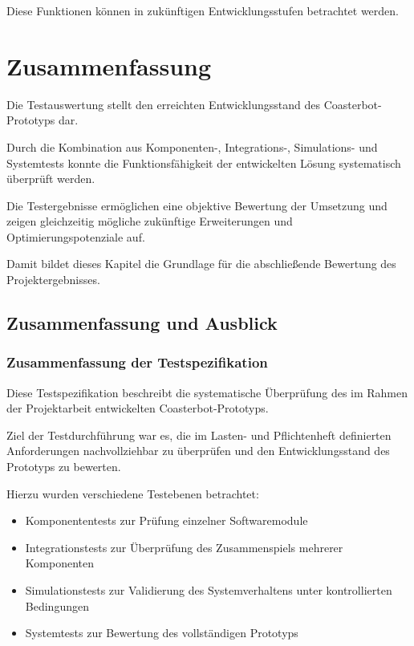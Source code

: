 Diese Funktionen können in zukünftigen Entwicklungsstufen betrachtet
werden.

\section{Zusammenfassung}\label{zusammenfassung-2}

Die Testauswertung stellt den erreichten Entwicklungsstand des
Coasterbot-Prototyps dar.

Durch die Kombination aus Komponenten-, Integrations-, Simulations- und
Systemtests konnte die Funktionsfähigkeit der entwickelten Lösung
systematisch überprüft werden.

Die Testergebnisse ermöglichen eine objektive Bewertung der Umsetzung
und zeigen gleichzeitig mögliche zukünftige Erweiterungen und
Optimierungspotenziale auf.

Damit bildet dieses Kapitel die Grundlage für die abschließende
Bewertung des Projektergebnisses.

\subsection{Zusammenfassung und
Ausblick}\label{zusammenfassung-und-ausblick}

\subsubsection{Zusammenfassung der
Testspezifikation}\label{zusammenfassung-der-testspezifikation}

Diese Testspezifikation beschreibt die systematische Überprüfung des im
Rahmen der Projektarbeit entwickelten Coasterbot-Prototyps.

Ziel der Testdurchführung war es, die im Lasten- und Pflichtenheft
definierten Anforderungen nachvollziehbar zu überprüfen und den
Entwicklungsstand des Prototyps zu bewerten.

Hierzu wurden verschiedene Testebenen betrachtet:

\begin{itemize}
\tightlist
\item
  Komponententests zur Prüfung einzelner Softwaremodule
\item
  Integrationstests zur Überprüfung des Zusammenspiels mehrerer
  Komponenten
\item
  Simulationstests zur Validierung des Systemverhaltens unter
  kontrollierten Bedingungen
\item
  Systemtests zur Bewertung des vollständigen Prototyps
\end{itemize}

